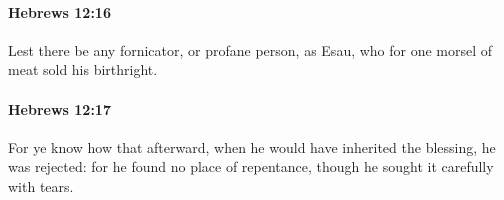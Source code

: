		\paragraph{Hebrews 12:16} %
			\label{HEBREWS-12-16}

			Lest there be any fornicator, or profane person, as Esau, who for one morsel of meat sold his birthright.

			\begin{framed}
			\scriptsize
				\begin{compactdesc}
					\item[SBLG] 
				\end{compactdesc}
			\end{framed}

		\paragraph{Hebrews 12:17} %
			\label{HEBREWS-12-17}

			For ye know how that afterward, when he would have inherited the blessing, he was rejected: for he found no place of repentance, though he sought it carefully with tears.

